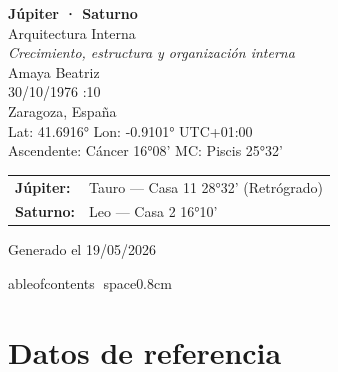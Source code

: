 \documentclass[11pt,a4paper]{article}
\begin{document}

\begin{titlepage}
\centering

\vspace*{2cm}

{\Huge\bfseries\color{azulai} Júpiter · Saturno}\\[0.4cm]

{\large\color{grisai} Arquitectura Interna}\\[0.25cm]

{\small\itshape\color{grisai}
Crecimiento, estructura y organización interna
}\\[1.8cm]

{\huge\color{doradoai} Amaya Beatriz}\\[1.2cm]

{\Large 30/10/1976 :10}\\[0.25cm]

{\Large Zaragoza, España}\\[0.25cm]

{\normalsize
Lat: 41.6916° \quad
Lon: -0.9101° \quad
UTC+01:00
}\\[0.4cm]

{\normalsize
Ascendente: Cáncer 16°08'
\quad
MC: Piscis 25°32'
}\\[1.6cm]

\begin{tabular}{ll}
\textbf{Júpiter:} & Tauro — Casa 11 28°32' (Retrógrado) \\
\textbf{Saturno:} & Leo — Casa 2 16°10' \\
\end{tabular}

\vfill

{\small\color{grisai}
Generado el 19/05/2026
}

\end{titlepage}

	ableofcontents
space{0.8cm}


\section{Datos de referencia}
\end{document}
